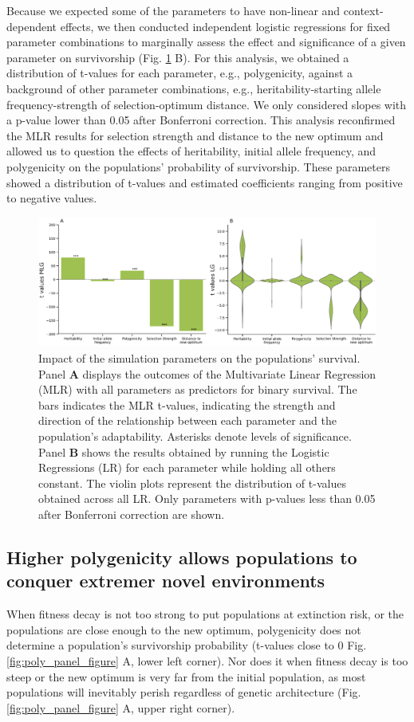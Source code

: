 \documentclass{article}
\begin{document}
Because we expected some of the parameters to have non-linear and context-dependent effects, we then conducted independent logistic regressions for fixed parameter combinations to marginally assess the effect and significance of a given parameter on survivorship (Fig. \ref{fig:glm_logisticreg} B). For this analysis, we obtained a distribution of t-values for each parameter, e.g., polygenicity, against a background of other parameter combinations, e.g., heritability-starting allele frequency-strength of selection-optimum distance. We only considered slopes with a p-value lower than 0.05 after Bonferroni correction. This analysis reconfirmed the MLR results for selection strength and distance to the new optimum and allowed us to question the effects of heritability, initial allele frequency, and polygenicity on the populations' probability of survivorship. These parameters showed a distribution of t-values and estimated coefficients ranging from positive to negative values.

\begin{figure}[h]
    \centering
    \includegraphics[width=1\textwidth]{figures/glm_logisticreg_newver.pdf}
    \caption{Impact of the simulation parameters on the populations' survival.  Panel \textbf{A} displays the outcomes of the Multivariate Linear Regression (MLR) with all parameters as predictors for binary survival. The bars indicates the MLR t-values, indicating the strength and direction of the relationship between each parameter and the population's adaptability. Asterisks denote levels of significance. Panel \textbf{B} shows the results obtained by running the
    Logistic Regressions (LR) for each parameter while holding all others constant. The violin plots represent the distribution of t-values obtained across all LR. Only parameters with p-values less than 0.05 after Bonferroni correction are shown.}
    \label{fig:glm_logisticreg}
\end{figure}


\subsection{Higher polygenicity allows populations to conquer extremer novel environments}
When fitness decay is not too strong to put populations at extinction risk, or the populations are close enough to the new optimum, polygenicity does not determine a population's survivorship probability (t-values close to 0 Fig. \ref{fig:poly_panel_figure} A, lower left corner). Nor does it when fitness decay is too steep or the new optimum is very far from the initial population, as most populations will inevitably perish regardless of genetic architecture (Fig. \ref{fig:poly_panel_figure} A, upper right corner).
\end{document}
